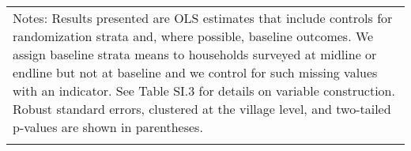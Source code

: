 \begin{longtable}{llcccccccccc}
\hline \hline                                                                                                                                                                                                                                                                                                                                                                                                                                                                                                                                                                                                                                                                                                                                                                                                                                                                             
\multicolumn{12}{p{\textwidth}}{{Notes: Results presented are OLS estimates that include controls for randomization strata and, where possible, baseline outcomes. We assign baseline strata means to households surveyed at midline or endline but not at baseline and we control for such missing values with an indicator. See Table SI.3 for details on variable construction. Robust standard errors, clustered at the village level, and two-tailed p-values are shown in parentheses. }} \\                                                                                                                                                                                                                                                                                                                                                                                        
\multicolumn{12}{p{\textwidth}}{{}} \\                                                                                                                                                                                                                                                                                                                                                                                                                                                                                                                                                                                                                                                                                                                                                                                                                                                    

\end{longtable}
